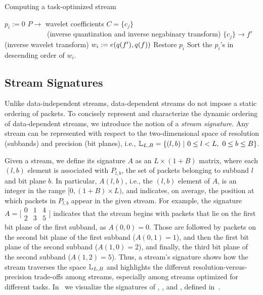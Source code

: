 \begin{algorithm}[h]
  \caption{Computing a task-optimized stream}
  \begin{algorithmic}[1]
			\State $p_i := 0$
      \State $P \rightarrow$ wavelet coefficients $C=\{c_j\}$\\
      		\ \ \ \ \ \ \ \ \ \ \ \ (inverse quantization and inverse negabinary transform)
			\State $\{c_j\} \rightarrow f'$ (inverse wavelet transform)
			\State $w_i := e(q(f'),q(f))$			
			\State Restore $p_i$
		\EndFor
		\State Sort the $p_i$'s in descending order of $w_i$.
	\end{algorithmic}
	\label{alg:greedy}
\end{algorithm}

\subsection{Stream Signatures} \label{sec:stream-signature}

Unlike data-independent streams, data-dependent streams do not impose a static ordering of packets.
To concisely represent and characterize the dynamic ordering of data-dependent streams, we introduce
the notion of a \emph{stream signature}. Any stream can be represented with respect to the
two-dimensional space of resolution (subbands) and precision (bit
planes), i.e., \mbox{${\mathbb L}_{L,B}=\{(l,b)\ |\ 0\leq l < L,\ 0\leq b \leq B\}$.}

Given a stream, we define its signature $A$ as an $L \times (1+B)$ matrix, where each $(l,b)$
element is associated with $P_{l,b}$, the set of packets belonging to subband $l$ and bit plane $b$.
In particular, $A(l,b)$, i.e., the $(l,b)$ element of $A$, is an integer in the range $[0,
(1+B)\times L)$, and indicates, on average, the position at which packets in $P_{l,b}$ appear in the
given stream. For example, the signature $A=\bigl[ \begin{smallmatrix}0 & 1 & 4\\
2 & 3 & 5\end{smallmatrix}\bigr]$ indicates that the stream begins with packets that lie on the
first bit plane of the first subband, as $A(0,0)=0$. Those are followed by packets on the second
bit plane of the first subband ($A(0,1)=1$), and then the first bit plane of the second subband
($A(1,0)=2$), and finally, the third bit plane of the second subband ($A(1,2)=5$). Thus, a
stream's signature shows how the stream traverses the space ${\mathbb L}_{L,B}$ and highlights the
different resolution-versus-precision trade-offs among streams, especially among \sopt streams
optimized for different tasks. In~ we visualize the signatures of
\sbit, \slvl, and \swav, defined in~.

